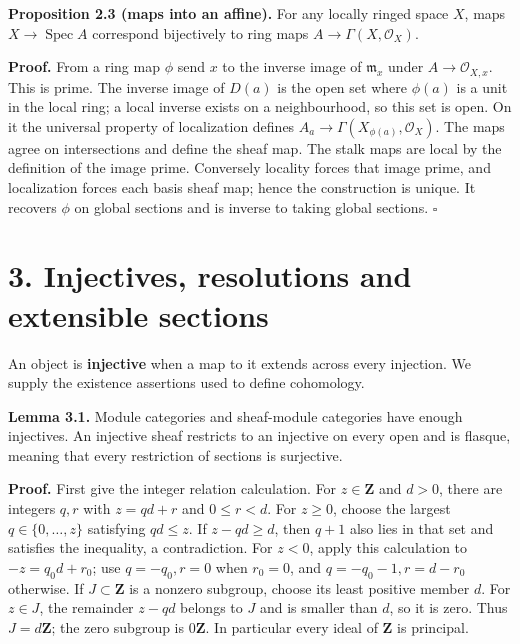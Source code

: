 \documentclass[11pt,a4paper,openany]{report}
\begin{document}
\textbf{Proposition 2.3 (maps into an affine).} For any locally ringed space \(X\), maps \(X\to\operatorname{Spec}A\) correspond bijectively to ring maps \(A\to\Gamma(X,\mathcal O_X)\).

\textbf{Proof.} From a ring map \(\phi\) send \(x\) to the inverse image of \(\mathfrak m_x\) under \(A\to\mathcal O_{X,x}\). This is prime. The inverse image of \(D(a)\) is the open set where \(\phi(a)\) is a unit in the local ring; a local inverse exists on a neighbourhood, so this set is open. On it the universal property of localization defines \(A_a\to\Gamma(X_{\phi(a)},\mathcal O_X)\). The maps agree on intersections and define the sheaf map. The stalk maps are local by the definition of the image prime. Conversely locality forces that image prime, and localization forces each basis sheaf map; hence the construction is unique. It recovers \(\phi\) on global sections and is inverse to taking global sections. \(\square\)

\section{3. Injectives, resolutions and extensible sections}\label{AG-RG-S01-injectives-resolutions-and-extensible-sections}

An object is \textbf{injective} when a map to it extends across every injection. We supply the existence assertions used to define cohomology.

\textbf{Lemma 3.1.} Module categories and sheaf-module categories have enough injectives. An injective sheaf restricts to an injective on every open and is flasque, meaning that every restriction of sections is surjective.

\textbf{Proof.} First give the integer relation calculation. For \(z\in\mathbf Z\) and \(d>0\), there are integers \(q,r\) with \(z=qd+r\) and \(0\le r<d\). For \(z\ge0\), choose the largest \(q\in\{0,\ldots,z\}\) satisfying \(qd\le z\). If \(z-qd\ge d\), then \(q+1\) also lies in that set and satisfies the inequality, a contradiction. For \(z<0\), apply this calculation to \(-z=q_0d+r_0\); use \(q=-q_0,r=0\) when \(r_0=0\), and \(q=-q_0-1,r=d-r_0\) otherwise. If \(J\subset\mathbf Z\) is a nonzero subgroup, choose its least positive member \(d\). For \(z\in J\), the remainder \(z-qd\) belongs to \(J\) and is smaller than \(d\), so it is zero. Thus \(J=d\mathbf Z\); the zero subgroup is \(0\mathbf Z\). In particular every ideal of \(\mathbf Z\) is principal.
\end{document}
